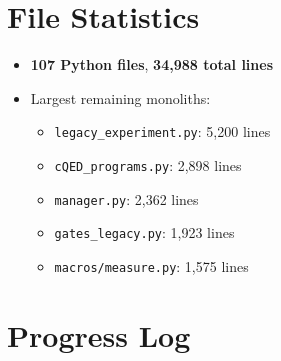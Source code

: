 \documentclass[11pt]{article}
\begin{document}
\section{File Statistics}

\begin{itemize}
  \item \textbf{107 Python files}, \textbf{34,988 total lines}
  \item Largest remaining monoliths:
    \begin{itemize}
      \item \texttt{legacy\_experiment.py}: 5,200 lines
      \item \texttt{cQED\_programs.py}: 2,898 lines
      \item \texttt{manager.py}: 2,362 lines
      \item \texttt{gates\_legacy.py}: 1,923 lines
      \item \texttt{macros/measure.py}: 1,575 lines
    \end{itemize}
\end{itemize}

\section{Progress Log}
\end{document}
